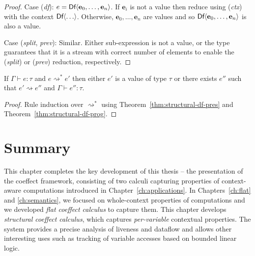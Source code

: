 \begin{proof}
\vspace{0.25em}\noindent\hangindent=0.6cm
Case (\emph{df}): $e = \ident{Df}\langle \textbf{e}_0, \ldots, \textbf{e}_n\rangle$. If $\textbf{e}_i$ is not a value
  then reduce using (\emph{ctx}) with the context $\textnormal{\sffamily Df}\langle \ldots \rangle$.
  Otherwise, $\textbf{e}_0, \ldots, \textbf{e}_n$ are values and so $\textnormal{\sffamily Df}\langle \textbf{e}_0, \ldots, \textbf{e}_n\rangle$
  is also a value.

\vspace{0.25em}\noindent\hangindent=0.6cm
Case (\emph{split}, \emph{prev}): Similar. Either sub-expression is not a value, or the type
  guarantees that it is a stream with correct number of elements to enable the (\emph{split})
  or (\emph{prev}) reduction, respectively.
\end{proof}

\begin{theorem}
  If $\Gamma \vdash e : \tau$ and $e \rightsquigarrow^{*} e'$ then either $e'$ is a value of type $\tau$ or
  there exists $e''$ such that $e' \rightsquigarrow e''$ and $\Gamma \vdash e'' : \tau$.
\end{theorem}
\begin{proof}
  Rule induction over $\rightsquigarrow^*$ using Theorem~\ref{thm:structural-df-pres} and Theorem~\ref{thm:structural-df-prog}.
\end{proof}


%
%


\section{Summary}

This chapter completes the key development of this thesis -- the presentation of the coeffect
framework, consisting of two calculi capturing properties of context-aware computations introduced
in Chapter~\ref{ch:applications}. In Chapters~\ref{ch:flat} and \ref{ch:semantics}, we focused on
whole-context properties of computations and we developed \emph{flat coeffect calculus} to capture them.
This chapter develops \emph{structural coeffect calculus}, which captures \emph{per-variable}
contextual properties. The system provides a precise analysis of liveness and dataflow and allows
other interesting uses such as tracking of variable accesses based on bounded linear logic.

